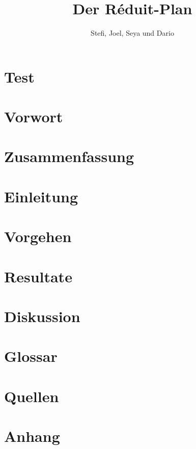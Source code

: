 \documentclass[opensans]{article}
\title{Der Réduit-Plan}
\author{Stefi, Joel, Seya und Dario}
\begin{document}
\begin{titlepage}
    \maketitle
\end{titlepage}

\tableofcontents

\newpage

\section{Test}

\section{Vorwort} \label{Vorwort}

\newpage 

\section{Zusammenfassung} \label{Zusammenfassung}

\newpage

\section{Einleitung} \label{Einleitung}

\newpage

\section{Vorgehen} \label{Vorgehen}

\newpage

\section{Resultate} \label{Resultate}

\newpage

\section{Diskussion} \label{Diskussion}

\newpage

\section{Glossar} \label{Glossar}
\newpage

\section{Quellen} \label{Quellen}
\printbibliography
\newpage

\section{Anhang} \label{Anhang}

 
\end{document}
